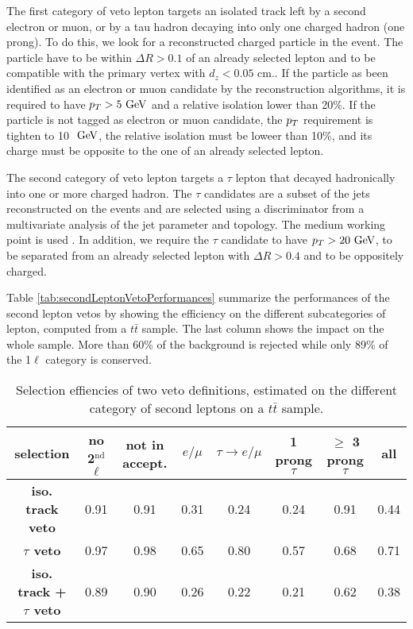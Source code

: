         The first category of veto lepton targets an isolated track left by a second electron or muon, or by a tau hadron
        decaying into only one charged hadron (one prong). To do this, we look for a reconstructed charged particle in the
        event. The particle have to be within $\Delta R > 0.1$ of an already selected lepton and to be compatible with the
        primary vertex with $d_z < 0.05$ cm.. If the particle as been identified as an electron or muon candidate by the 
        reconstruction algorithms, it is required to have $p_T > 5 ~\text{GeV}$ and a relative isolation lower than 20\%. If the
        particle is not tagged as electron or muon candidate, the $p_T$ requirement is tighten to 10 $~\text{GeV}$, the relative
        isolation must be loweer than 10\%, and its charge must be opposite to the one of an already selected lepton.

        The second category of veto lepton targets a $\tau$ lepton that decayed hadronically into one or more charged hadron.
        The $\tau$ candidates are a subset of the jets reconstructed on the events and are selected using a discriminator
        from a multivariate analysis of the jet parameter and topology. The medium working point is used .
        In addition, we require the $\tau$ candidate to have $p_T > 20 ~\text{GeV}$, to be separated from an already selected
        lepton with $\Delta R > 0.4$ and to be oppositely charged. 

        Table \ref{tab:secondLeptonVetoPerformances} summarize the performances of the second lepton vetos by showing the
        efficiency on the different subcategories of lepton, computed from a $t\bar{t}$ sample. The last column shows the
        impact on the whole sample. More than 60\% of the background is rejected while only 89\% of the 1$\ell$ category is
        conserved.

        \begin{table}
        \hspace*{-1.2cm}
        \begin{tabular}{|c|c|cccccc|}
            \hline
            \textbf{selection}                  & no 2$^\text{nd}$ $\ell$ & not in accept. & $e/\mu$ & $\tau \rightarrow e/\mu$ & 1 prong $\tau $&$\geq$ 3 prong $\tau$ & all \\
            \hline
            \textbf{iso. track veto}            & 0.91                    & 0.91  & 0.31  & 0.24  & 0.24  & 0.91  & 0.44  \\  
            \textbf{$\tau$ veto}                & 0.97                    & 0.98  & 0.65  & 0.80  & 0.57  & 0.68  & 0.71  \\
            \hline
            \textbf{iso. track + $\tau$ veto}   & 0.89                    & 0.90  & 0.26  & 0.22  & 0.21  & 0.62  & 0.38 \\
            \hline
        \end{tabular}
            \caption{Selection effiencies of two veto definitions, estimated on the different category of second leptons on a $t\bar{t}$ sample.}
            \label{secondLeptonVetoPerformances}
        \end{table}


